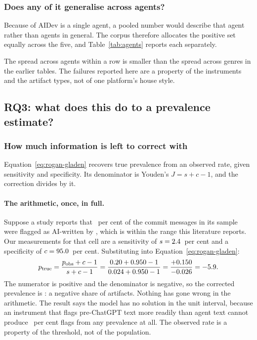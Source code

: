 \subsubsection{Does any of it generalise across agents?}
\label{sec:validity:rq2:agents}



Because \AidevTopAgentShare{} of AIDev is a single agent, a pooled number would describe
that agent rather than agents in general. The corpus therefore allocates the positive
set equally across the five, and Table~\ref{tab:agents} reports each separately.

The spread across agents within a row is smaller than the spread across genres in the
earlier tables. The failures reported here are a property of the instruments and the
artifact types, not of one platform's house style.

\subsection{RQ3: what does this do to a prevalence estimate?}
\label{sec:correction}

\subsubsection{How much information is left to correct with}
\label{sec:correction:youden}

Equation~\eqref{eq:rogan-gladen} recovers true prevalence from an observed rate, given
sensitivity and specificity. Its denominator is Youden's $J = s + c - 1$, and the
correction divides by it.



\paragraph{The arithmetic, once, in full.} Suppose a study reports that
\WorkedAp{}~per cent of the commit messages in its sample were flagged as AI-written by
\WorkedDetector{}, which is within the range this literature reports. Our measurements
for that cell are a sensitivity of $s = 2.4{}$~per cent and a specificity of
$c = 95.0{}$~per cent. Substituting into Equation~\eqref{eq:rogan-gladen}:
%
\begin{equation*}
  p_{\text{true}}
  = \frac{p_{\text{obs}} + c - 1}{s + c - 1}
  = \frac{0.20{} + 0.950 - 1}{0.024 + 0.950 - 1}
  = \frac{+0.150{}}{-0.026{}}
  = -5.9{}.
\end{equation*}
%
The numerator is positive and the denominator is negative, so the corrected prevalence
is \WorkedQuotient{}: a negative share of artifacts. Nothing has gone wrong in the
arithmetic. The result says the model has no solution in the unit interval, because an
instrument that flags pre-ChatGPT text more readily than agent text cannot produce
\WorkedAp{}~per cent flags from any prevalence at all. The observed rate is a property
of the threshold, not of the population.

